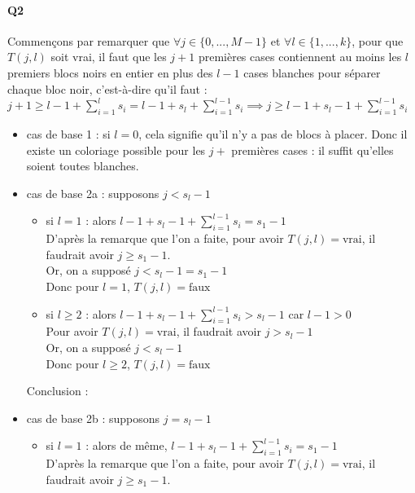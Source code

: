\documentclass[12pt]{article}
\newcommand{\true}{\text{vrai}}
\newcommand{\false}{\text{faux}}
\begin{document}
			\paragraph{Q2}
				Commençons par remarquer que $ \forall j \in \{0,...,M-1\} $ et $ \forall l \in \{1,...,k\} $, pour que $ T(j,l) $ soit vrai, il faut que les $ j+1 $ premières cases contiennent au moins les $ l $ premiers blocs noirs en entier en plus des $ l-1 $ cases blanches pour séparer chaque bloc noir, c'est-à-dire qu'il faut : \\
				$ j+1 \geq l-1 + \sum\limits_{i=1}^{l} s_i = l-1 + s_l + \sum\limits_{i=1}^{l-1} s_i \implies \boxed{j \geq l-1 + s_l-1 + \sum\limits_{i=1}^{l-1} s_i} $
				\begin{itemize}
					\item cas de base 1 : si $ l = 0 $, cela signifie qu'il n'y a pas de blocs à placer. Donc il existe un coloriage possible pour les $ j+ $ premières cases : il suffit qu'elles soient toutes blanches.
					\item cas de base 2a : supposons $ j < s_l-1 $
					\begin{itemize}
						\item si $ l=1 $ : alors $ l-1 + s_l-1 + \sum\limits_{i=1}^{l-1} s_i = s_1 - 1 $ \\
						D'après la remarque que l'on a faite, pour avoir $ T(j,l) = \true $, il faudrait avoir $ j \geq s_1-1 $. \\
						Or, on a supposé $ j < s_l-1 = s_1 - 1 $ \\
						Donc pour $ l=1 $, $ T(j,l) = \false $
						\item si $ l \geq 2 $ : alors $ l-1 + s_l-1 + \sum\limits_{i=1}^{l-1} s_i > s_l - 1 $ car $ l-1 > 0 $ \\
						Pour avoir $ T(j,l) = \true $, il faudrait avoir $ j > s_l - 1 $ \\
						Or, on a supposé $ j < s_l-1 $ \\
						Donc pour $ l \geq 2 $, $ T(j,l) = \false $
					\end{itemize}
					Conclusion : \fbox{$ \forall l \geq 1 $, si $ j < s_l - 1 $, alors  $ T(j,l) = \false $}
					\item cas de base 2b : supposons $ j = s_l - 1 $
					\begin{itemize}
						\item si $ l=1 $ : alors de même, $ l-1 + s_l-1 + \sum\limits_{i=1}^{l-1} s_i = s_1 - 1 $ \\
						D'après la remarque que l'on a faite, pour avoir $ T(j,l) = \true $, il faudrait avoir $ j \geq s_1-1 $. \\

\end{itemize}
\end{itemize}
\end{document}

